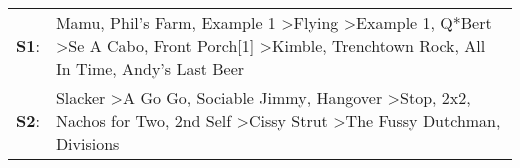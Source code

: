 \begin{supertabular}{p{0.03\textwidth}p{0.92\textwidth}}
 \textbf{S1}:  &  Mamu\textsuperscript{}, \enspace Phil's Farm\textsuperscript{}, \enspace Example 1\textsuperscript{} \textgreater \enspace Flying\textsuperscript{} \textgreater \enspace Example 1\textsuperscript{}, \enspace Q*Bert\textsuperscript{} \textgreater \enspace Se A Cabo\textsuperscript{}, \enspace Front Porch[1]\textsuperscript{} \textgreater \enspace Kimble\textsuperscript{}, \enspace Trenchtown Rock\textsuperscript{}, \enspace All In Time\textsuperscript{}, \enspace Andy's Last Beer\textsuperscript{}  \enspace  \\
 \textbf{S2}:  &                                            Slacker\textsuperscript{} \textgreater \enspace A Go Go\textsuperscript{}, \enspace Sociable Jimmy\textsuperscript{}, \enspace Hangover\textsuperscript{} \textgreater \enspace Stop\textsuperscript{}, \enspace 2x2\textsuperscript{}, \enspace Nachos for Two\textsuperscript{}, \enspace 2nd Self\textsuperscript{} \textgreater \enspace Cissy Strut\textsuperscript{} \textgreater \enspace The Fussy Dutchman\textsuperscript{}, \enspace Divisions\textsuperscript{}  \enspace  \\
\end{supertabular}
